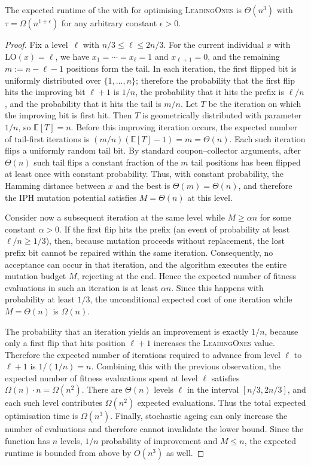 \begin{theorem} \label{thm:leadingonesexpo}
The expected runtime of the   %
with {\linHD }  for optimising
\textsc{LeadingOnes} is $\Theta(n^3)$ with $\tau=\Omega(n^{1+\epsilon})$ for any arbitrary 
constant $\epsilon>0$.
\end{theorem}
\begin{proof}
	
Fix a level~$\ell$ with $n/3\le \ell\le 2n/3$. For the current individual $x$ with $\mathrm{LO}(x)=\ell$, we have $x_1=\cdots=x_{\ell}=1$ and $x_{\ell+1}=0$, and the remaining $m:=n-\ell-1$ positions form the tail. In each iteration, the first flipped bit is uniformly distributed over $\{1,\dots,n\}$; therefore the probability that the first flip hits the improving bit $\ell+1$ is $1/n$, the probability that it hits the prefix is $\ell/n$, and the probability that it hits the tail is $m/n$. Let $T$ be the iteration on which the improving bit is first hit. Then $T$ is geometrically distributed with parameter~$1/n$, so $\mathbb{E}[T]=n$. Before this improving iteration occurs, the expected number of tail-first iterations is $(m/n)(\mathbb{E}[T]-1)=m=\Theta(n)$. Each such iteration flips a uniformly random tail bit. By standard coupon–collector arguments, after $\Theta(n)$ such tail flips a constant fraction of the $m$ tail positions has been flipped at least once with constant probability. Thus, with constant probability, the Hamming distance between $x$ and the best is $\Theta(m)=\Theta(n)$, and therefore the IPH mutation potential satisfies $M=\Theta(n)$ at this level.
	
	Consider now a subsequent iteration at the same level while $M\ge \alpha n$ for some constant $\alpha>0$. If the first flip hits the prefix (an event of probability at least $\ell/n\ge 1/3$), then, because mutation proceeds without replacement, the lost prefix bit cannot be repaired within the same iteration. Consequently, no acceptance can occur in that iteration, and the algorithm executes the entire mutation budget $M$, rejecting at the end. Hence the expected number of fitness evaluations in such an iteration is at least $\alpha n$. Since this happens with probability at least $1/3$, the unconditional expected cost of one iteration while $M=\Theta(n)$ is $\Omega(n)$.
	
	The probability that an iteration yields an improvement is exactly $1/n$, because only a first flip that hits position $\ell+1$ increases the \textsc{LeadingOnes} value. Therefore the expected number of iterations required to advance from level $\ell$ to $\ell+1$ is $1/(1/n)=n$. Combining this with the previous observation, the expected number of fitness evaluations spent at level $\ell$ satisfies $\Omega(n)\cdot n=\Omega(n^2)$.
	There are $\Theta(n)$ levels $\ell$ in the interval $[n/3,2n/3]$, and each such level contributes $\Omega(n^2)$ expected evaluations. Thus the total expected optimisation time is $\Omega(n^3)$. Finally, stochastic ageing can only increase the number of evaluations and therefore cannot invalidate the lower bound. Since the function has $n$ levels, $1/n$ probability of improvement and $M\leq n$, the expected runtime is bounded from above by $O(n^3)$ as well.
	
	
\end{proof}
